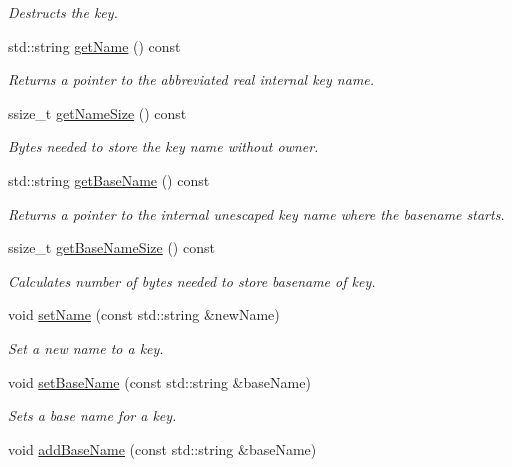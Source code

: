 \begin{DoxyCompactItemize}
\begin{DoxyCompactList}\small\item\em Destructs the key. \end{DoxyCompactList}\item 
std\+::string \hyperlink{classkdb_1_1Key_a6c1812730e9cb714893c9f9b1e503303}{get\+Name} () const
\begin{DoxyCompactList}\small\item\em Returns a pointer to the abbreviated real internal {\ttfamily key} name. \end{DoxyCompactList}\item 
ssize\+\_\+t \hyperlink{classkdb_1_1Key_a976627183cdc6835a969475e99ec8bc1}{get\+Name\+Size} () const
\begin{DoxyCompactList}\small\item\em Bytes needed to store the key name without owner. \end{DoxyCompactList}\item 
std\+::string \hyperlink{classkdb_1_1Key_ab998c6e1b121b956653f01df5762aed8}{get\+Base\+Name} () const
\begin{DoxyCompactList}\small\item\em Returns a pointer to the internal unescaped key name where the {\ttfamily basename} starts. \end{DoxyCompactList}\item 
ssize\+\_\+t \hyperlink{classkdb_1_1Key_aef3cc0ef1621b91718604e899b43ebc0}{get\+Base\+Name\+Size} () const
\begin{DoxyCompactList}\small\item\em Calculates number of bytes needed to store basename of {\ttfamily key}. \end{DoxyCompactList}\item 
void \hyperlink{classkdb_1_1Key_aac3b5d3a854d02187484bfbdbdf975af}{set\+Name} (const std\+::string \&new\+Name)
\begin{DoxyCompactList}\small\item\em Set a new name to a key. \end{DoxyCompactList}\item 
void \hyperlink{classkdb_1_1Key_a0c8c7cef03d6482d89973be72fb3c8b8}{set\+Base\+Name} (const std\+::string \&base\+Name)
\begin{DoxyCompactList}\small\item\em Sets a base name for a key. \end{DoxyCompactList}\item 
void \hyperlink{classkdb_1_1Key_ad2f72ce0985413ce588dc33a575ea306}{add\+Base\+Name} (const std\+::string \&base\+Name)

\end{DoxyCompactItemize}
